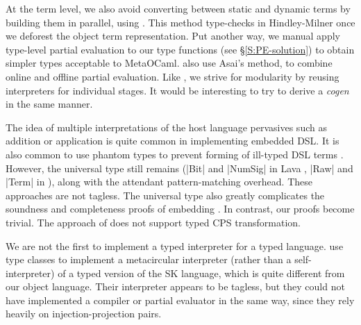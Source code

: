 At the term level, we also avoid converting between static and dynamic
terms by building them in parallel, using \citet{asai-binding-time}.
This method type-checks in Hindley-Milner once we
deforest the object term representation.  Put another way, we
manual apply type-level partial evaluation to our type
functions (see \S\ref{S:PE-solution}) to obtain simpler types 
acceptable to MetaOCaml.
 also use Asai's method,
to combine online
and offline partial evaluation.  Like \cite{SperberThiemann:TwoForOne},
we strive for modularity by reusing interpreters for individual stages.  It would be interesting
to try to derive a \emph{cogen} \cite{Thiemann:cogeninsixlines}
in the same manner.

The idea of multiple interpretations of the host language pervasives
such as addition or application is quite common in implementing
embedded DSL. It is also common to use phantom types to prevent
forming of ill-typed DSL terms \cite{Lava,Rhiger-thesis}. However,
the universal type still remains (|Bit| and |NumSig| in Lava
\cite{Lava}, |Raw| and |Term| in \cite[Fig 2.2,
  Sec. 3]{Rhiger-thesis}), along with the attendant pattern-matching
overhead. These approaches are not tagless.  The universal type also
greatly complicates the soundness and completeness proofs of embedding
\cite{Rhiger-thesis}. In contrast, our proofs become trivial.
The approach of  does not 
support typed CPS transformation.
\begin{comment}
Rhiger's But Fig 2.2, p33: universal type Raw.  He uses phantom type
upon the Exp datatype. But that is cheating: phantom type means
essentially we can easily do coerce. We use real types.  That's why he
had to do tedious proofs in Sec 2 of soundness and completeness of
embedding. Whereas our proofs are obvious.  His sec 3 is based on data
representation of terms. They have type tags.  We do nothing of that
kind: See Sec 3.1.2. See numerous "data Term" in Sec3, which is the U
type.  In Sec 3.3.4 (p76) Rhiger specifically says that his encoding
cannot do typed CPS transformation -- whereas our does. BTW, Rhiger
thesis contains the definitions of the interpreter and the compiler,
in the beginning. Use this in response to Rev1)
\end{comment}


We are not the first to implement a typed interpreter for a typed
language.   use type classes to implement a metacircular
interpreter (rather than a self\hyp interpreter) of a
typed version of the SK language, which is quite different from our
object language.  Their interpreter
appears to be tagless, but they could not have implemented a
compiler or partial evaluator in the same way, since they rely
heavily on injection\hyp projection pairs.

